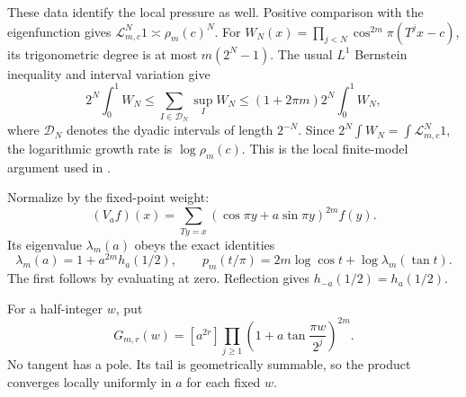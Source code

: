 \documentclass[11pt,a4paper]{article}
\theoremstyle{remark}\newtheorem*{ednote}{Editorial note (ProveIt, 2026-10-01)}
\newcommand{\Lop}{\mathcal L}
\begin{document}
These data identify the local pressure as well. Positive comparison with the eigenfunction gives $\Lop_{m,c}^N1\asymp\rho_m(c)^N$. For $W_N(x)=\prod_{j<N}\cos^{2m}\!\pi(T^jx-c)$, its trigonometric degree is at most $m(2^N-1)$. The usual $L^1$ Bernstein inequality and interval variation give
\[
 2^N\!\int_0^1W_N
 \le\sum_{I\in\mathcal D_N}\sup_IW_N
 \le(1+2\pi m)2^N\!\int_0^1W_N,
\]
where $\mathcal D_N$ denotes the dyadic intervals of length $2^{-N}$. Since $2^N\int W_N=\int\Lop_{m,c}^N1$, the logarithmic growth rate is $\log\rho_m(c)$. This is the local finite-model argument used in \cite{integer,first}.

Normalize by the fixed-point weight:
\[
 (V_af)(x)=\sum_{Ty=x}(\cos\pi y+a\sin\pi y)^{2m}f(y).
\]
Its eigenvalue $\lambda_m(a)$ obeys the exact identities
\begin{equation}\label{eq:feedback}
 \lambda_m(a)=1+a^{2m}h_a(1/2),\qquad
 p_m(t/\pi)=2m\log\cos t+\log\lambda_m(\tan t).
\end{equation}
The first follows by evaluating at zero. Reflection gives $h_{-a}(1/2)=h_a(1/2)$.

For a half-integer $w$, put
\begin{equation}\label{eq:G}
 G_{m,r}(w)=[a^{2r}]
 \prod_{j\ge1}\left(1+a\tan\frac{\pi w}{2^j}\right)^{2m}.
\end{equation}
No tangent has a pole. Its tail is geometrically summable, so the product converges locally uniformly in $a$ for each fixed $w$.
\end{document}
